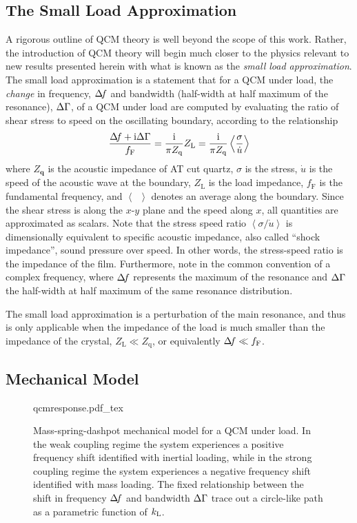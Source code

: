 \subsection{The Small Load Approximation}
A rigorous outline of QCM theory is well beyond the scope of this work.
Rather, the introduction of QCM theory will begin much closer to the
physics relevant to new results presented herein with what is known as the
\textit{small load approximation}.  The small load approximation is a
statement that for a QCM under load, the \textit{change} in frequency,
$\Delta\!f$ and bandwidth (half-width at half maximum of the resonance), $\Delta\Gamma$,
of a QCM under load are computed by evaluating the ratio of shear stress to
speed on the oscillating boundary, according to the
relationship~\cite{eggers1987method}~\cite{johannsmann1992viscoelastic}
\begin{equation}
 \frac{\Delta\!f+{\mathrm{i}}\Delta\Gamma}{f_{\mathrm{F}}}=\frac{{\mathrm{i}}}{\pi Z_{\mathrm{q}}}Z_\mathrm{L} =\frac{{\mathrm{i}}}{\pi Z_{\mathrm{q}}}\left<\frac{\sigma}{\dot{u}}\right>
\label{eqn:comsolextract}
\end{equation}
where $Z_\mathbf{q}$ is the acoustic impedance of AT cut quartz, $\sigma$
is the stress, $\dot{u}$ is the speed of the acoustic wave at the
boundary, $Z_\mathrm{L}$ is the load impedance, $f_{\mathrm{F}}$ is the
fundamental frequency, and $\left<\enspace\right>$ denotes an average
along the boundary.  Since the shear stress is along the $x$-$y$ plane and
the speed along $x$, all quantities are approximated as scalars.
Note that the stress speed ratio
$\left<\sigma/\dot{u}\right>$ is dimensionally equivalent to specific
acoustic impedance, also called ``shock impedance'', sound pressure over
speed.  In other words, the stress-speed ratio is the impedance of the
film.  Furthermore, note in  the common
convention of a complex frequency, where $\Delta\!f$ represents the maximum of
the resonance and $\Delta\Gamma$ the half-width at half maximum of the same
resonance distribution.

The small load approximation is a perturbation of the main resonance, and
thus is only applicable when the impedance of the load is much smaller than
the impedance of the crystal, $Z_\mathrm{L} \ll Z_\mathrm{q}$, or
equivalently $\Delta\!f \ll f_\mathrm{F}$.

\subsection{Mechanical Model}
\begin{figure}
\centering
{qcmresponse.pdf_tex}
\caption{ Mass-spring-dashpot mechanical model for a QCM under load. In the
weak coupling regime the system experiences a positive frequency shift
identified with inertial loading, while in the strong coupling regime the
system experiences a negative frequency shift identified with mass loading.
The fixed relationship between the shift in frequency $\Delta\!f$ and bandwidth
$\Delta\Gamma$ trace out a circle-like path as a parametric function of $k_\mathrm{L}$.}
\label{fig:mechanicalmodel}
\end{figure}

